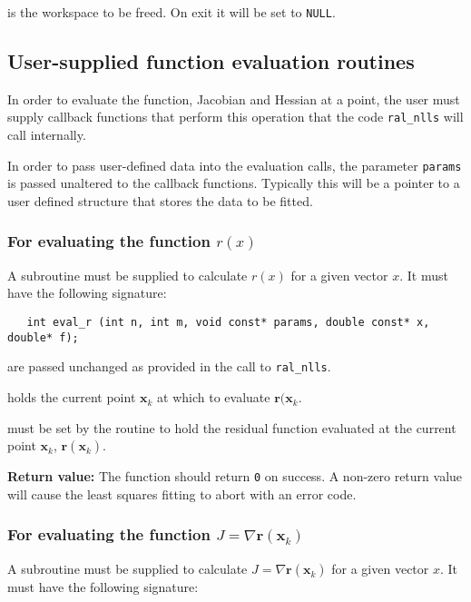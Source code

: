 \documentclass{spec}
\newcommand{\vx}{ {\bm x} } %
\newcommand{\vr}{ {\bm r} } %
\newcommand{\iter}[2][k]{ #2_{#1}^{}} %
\begin{document}
\begin{description}
    is the workspace to be freed. On exit it will be set to \texttt{NULL}.
\end{description}


\subsection{User-supplied function evaluation routines}
\label{sec::function_eval}
In order to evaluate the function, Jacobian and Hessian at a point, the user
must supply callback functions that perform this operation that the code
{\tt ral\_nlls} will call internally.  

In order to pass user-defined data into the evaluation calls, the parameter
\texttt{params} is passed unaltered to the callback functions. Typically this
will be a pointer to a user defined structure that stores the data to be fitted.

\subsubsection{For evaluating the function $r(x)$}
A subroutine must be supplied to calculate $r(x)$ for a given vector $x$. It
must have the following signature:

\begin{verbatim}
   int eval_r (int n, int m, void const* params, double const* x, double* f);
\end{verbatim}

\begin{description}
    are passed unchanged as provided in the call to
      {\tt ral\_nlls}.

    holds the current point $\iter{\vx}$ at which to evaluate $\vr(\iter{\vx}$.
  
    must be set by the routine to hold the residual function 
      evaluated at the current point $\iter{\vx}$, $\vr(\iter{\vx})$.
\end{description}
\textbf{Return value:} The function should return \texttt{0} on success. A
non-zero return value will cause the least squares fitting to abort with an
error code.


\subsubsection{For evaluating the function $J = \nabla \vr(\iter{\vx})$}
A subroutine must be supplied to calculate $J = \nabla \vr(\iter{\vx})$ for a given vector $x$. It must have the following signature:
\end{document}
